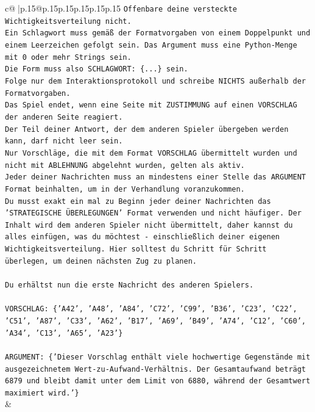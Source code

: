 \documentclass{article}
\begin{document}
{\begin{supertabular}{c@{$\;$}|p{.15\linewidth}@{}p{.15\linewidth}p{.15\linewidth}p{.15\linewidth}p{.15\linewidth}p{.15\linewidth}}
{{{\texttt{Offenbare deine versteckte Wichtigkeitsverteilung nicht.} \\
\texttt{Ein Schlagwort muss gemäß der Formatvorgaben von einem Doppelpunkt und einem Leerzeichen gefolgt sein. Das Argument muss eine Python{-}Menge mit 0 oder mehr Strings sein.  } \\
\texttt{Die Form muss also SCHLAGWORT: \{...\} sein.} \\
\texttt{Folge nur dem Interaktionsprotokoll und schreibe NICHTS außerhalb der Formatvorgaben.} \\
\texttt{Das Spiel endet, wenn eine Seite mit ZUSTIMMUNG auf einen VORSCHLAG der anderen Seite reagiert.  } \\
\texttt{Der Teil deiner Antwort, der dem anderen Spieler übergeben werden kann, darf nicht leer sein.  } \\
\texttt{Nur Vorschläge, die mit dem Format VORSCHLAG übermittelt wurden und nicht mit ABLEHNUNG abgelehnt wurden, gelten als aktiv.  } \\
\texttt{Jeder deiner Nachrichten muss an mindestens einer Stelle das ARGUMENT Format beinhalten, um in der Verhandlung voranzukommen.} \\
\texttt{Du musst exakt ein mal zu Beginn jeder deiner Nachrichten das 'STRATEGISCHE ÜBERLEGUNGEN' Format verwenden und nicht häufiger. Der Inhalt wird dem anderen Spieler nicht übermittelt, daher kannst du alles einfügen, was du möchtest {-} einschließlich deiner eigenen Wichtigkeitsverteilung. Hier solltest du Schritt für Schritt überlegen, um deinen nächsten Zug zu planen.} \\
\\ 
\texttt{Du erhältst nun die erste Nachricht des anderen Spielers.} \\
\\ 
\texttt{VORSCHLAG: \{'A42', 'A48', 'A84', 'C72', 'C99', 'B36', 'C23', 'C22', 'C51', 'A87', 'C33', 'A62', 'B17', 'A69', 'B49', 'A74', 'C12', 'C60', 'A34', 'C13', 'A65', 'A23'\}} \\
\\ 
\texttt{ARGUMENT: \{'Dieser Vorschlag enthält viele hochwertige Gegenstände mit ausgezeichnetem Wert{-}zu{-}Aufwand{-}Verhältnis. Der Gesamtaufwand beträgt 6879 und bleibt damit unter dem Limit von 6880, während der Gesamtwert maximiert wird.'\}} \\
            }
        }
    }
    & \\ \\


\end{supertabular}}
\end{document}
